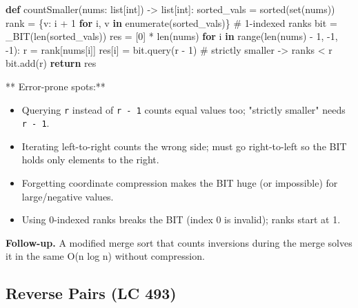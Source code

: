 \documentclass[11pt]{article}
\providecommand{\tightlist}{\setlength{\itemsep}{1pt}\setlength{\parskip}{0pt}}
\newenvironment{Shaded}{\begin{snugshade}}{\end{snugshade}}
\newcommand{\BuiltInTok}[1]{\textcolor[rgb]{0.50,0.55,0.55}{#1}}
\newcommand{\CommentTok}[1]{\textcolor[rgb]{0.48,0.49,0.49}{#1}}
\newcommand{\ControlFlowTok}[1]{\textcolor[rgb]{0.99,0.74,0.29}{\textbf{#1}}}
\newcommand{\DecValTok}[1]{\textcolor[rgb]{0.96,0.45,0.00}{#1}}
\newcommand{\KeywordTok}[1]{\textcolor[rgb]{0.81,0.81,0.76}{\textbf{#1}}}
\newcommand{\NormalTok}[1]{\textcolor[rgb]{0.81,0.81,0.76}{#1}}
\newcommand{\OperatorTok}[1]{\textcolor[rgb]{0.81,0.81,0.76}{#1}}
\begin{document}
\begin{Shaded}
\begin{Highlighting}[]
\KeywordTok{def}\NormalTok{ countSmaller(nums: }\BuiltInTok{list}\NormalTok{[}\BuiltInTok{int}\NormalTok{]) }\OperatorTok{{-}\textgreater{}} \BuiltInTok{list}\NormalTok{[}\BuiltInTok{int}\NormalTok{]:}
\NormalTok{    sorted\_vals }\OperatorTok{=} \BuiltInTok{sorted}\NormalTok{(}\BuiltInTok{set}\NormalTok{(nums))}
\NormalTok{    rank }\OperatorTok{=}\NormalTok{ \{v: i }\OperatorTok{+} \DecValTok{1} \ControlFlowTok{for}\NormalTok{ i, v }\KeywordTok{in} \BuiltInTok{enumerate}\NormalTok{(sorted\_vals)\}  }\CommentTok{\# 1{-}indexed ranks}
\NormalTok{    bit }\OperatorTok{=}\NormalTok{ \_BIT(}\BuiltInTok{len}\NormalTok{(sorted\_vals))}
\NormalTok{    res }\OperatorTok{=}\NormalTok{ [}\DecValTok{0}\NormalTok{] }\OperatorTok{*} \BuiltInTok{len}\NormalTok{(nums)}
    \ControlFlowTok{for}\NormalTok{ i }\KeywordTok{in} \BuiltInTok{range}\NormalTok{(}\BuiltInTok{len}\NormalTok{(nums) }\OperatorTok{{-}} \DecValTok{1}\NormalTok{, }\OperatorTok{{-}}\DecValTok{1}\NormalTok{, }\OperatorTok{{-}}\DecValTok{1}\NormalTok{):}
\NormalTok{        r }\OperatorTok{=}\NormalTok{ rank[nums[i]]}
\NormalTok{        res[i] }\OperatorTok{=}\NormalTok{ bit.query(r }\OperatorTok{{-}} \DecValTok{1}\NormalTok{)          }\CommentTok{\# strictly smaller {-}\textgreater{} ranks \textless{} r}
\NormalTok{        bit.add(r)}
    \ControlFlowTok{return}\NormalTok{ res}
\end{Highlighting}
\end{Shaded}

** Error-prone spots:**

\begin{itemize}
\tightlist
\item
  Querying \texttt{r} instead of \texttt{r\ -\ 1} counts equal values too; "strictly smaller" needs \texttt{r\ -\ 1}.
\item
  Iterating left-to-right counts the wrong side; must go right-to-left so the BIT holds only elements to the right.
\item
  Forgetting coordinate compression makes the BIT huge (or impossible) for large/negative values.
\item
  Using 0-indexed ranks breaks the BIT (index 0 is invalid); ranks start at 1.
\end{itemize}

\textbf{Follow-up.} A modified merge sort that counts inversions during the merge solves it in the same O(n log n) without compression.

\subsection{Reverse Pairs (LC 493)}\label{reverse-pairs-lc-493}
\end{document}
